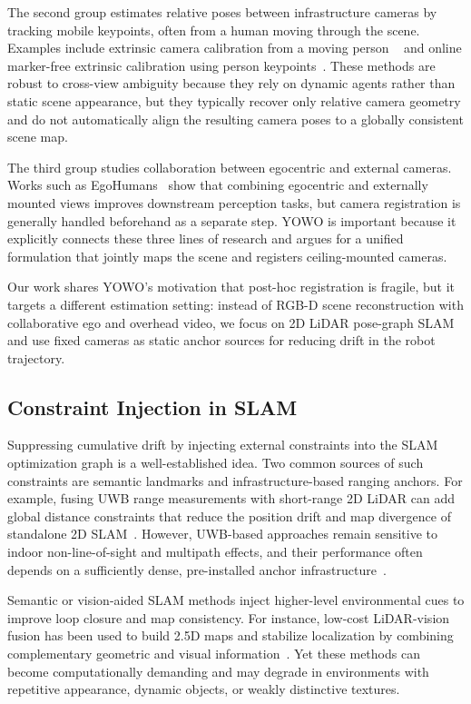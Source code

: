 The second group estimates relative poses between infrastructure cameras by
tracking mobile keypoints, often from a human moving through the scene.
Examples include extrinsic camera calibration from a moving person
~\cite{lee2022extrinsic} and online marker-free extrinsic calibration using
person keypoints~\cite{patzold2022online}.
These methods are robust to cross-view ambiguity because they rely on dynamic
agents rather than static scene appearance, but they typically recover only
relative camera geometry and do not automatically align the resulting camera
poses to a globally consistent scene map.

The third group studies collaboration between egocentric and external cameras.
Works such as EgoHumans~\cite{khirodkar2023egohumans} show that combining
egocentric and externally mounted views improves downstream perception tasks,
but camera registration is generally handled beforehand as a separate step.
YOWO is important because it explicitly connects these three lines of research
and argues for a unified formulation that jointly maps the scene and registers
ceiling-mounted cameras.

Our work shares YOWO's motivation that post-hoc registration is fragile, but it
targets a different estimation setting: instead of RGB-D scene reconstruction
with collaborative ego and overhead video, we focus on 2D LiDAR pose-graph SLAM
and use fixed cameras as static anchor sources for reducing drift in the robot
trajectory.

\subsection{Constraint Injection in SLAM}

Suppressing cumulative drift by injecting external constraints into the SLAM
optimization graph is a well-established idea.
Two common sources of such constraints are semantic landmarks and
infrastructure-based ranging anchors.
For example, fusing UWB range measurements with short-range 2D LiDAR can add
global distance constraints that reduce the position drift and map divergence of
standalone 2D SLAM~\cite{liu2022uwb2dlidar}.
However, UWB-based approaches remain sensitive to indoor non-line-of-sight and
multipath effects, and their performance often depends on a sufficiently dense,
pre-installed anchor infrastructure~\cite{liu2022uwb_nlos,jiang2025gpsdenied}.

Semantic or vision-aided SLAM methods inject higher-level environmental cues to
improve loop closure and map consistency.
For instance, low-cost LiDAR-vision fusion has been used to build 2.5D maps and
stabilize localization by combining complementary geometric and visual
information~\cite{jiang2019lidarvision}.
Yet these methods can become computationally demanding and may degrade in
environments with repetitive appearance, dynamic objects, or weakly distinctive
textures.

